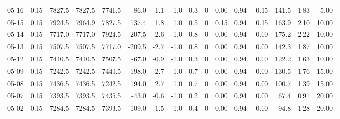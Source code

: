 \begin{threeparttable}
{\begin{tabular}{lrrrrrrrrrrrrrrr}
  05-16 &     0.15 & 7827.5 & 7827.5 & 7741.5 &       86.0 &            1.1 &                      1.0 &                 0.3 &              0 &       0.00 &      0.94 &          -0.15 &            141.5 &            1.83 &                   5.00 \\
  05-15 &     0.15 & 7924.5 & 7964.9 & 7827.5 &      137.4 &            1.8 &                      1.0 &                 0.5 &              0 &       0.15 &      0.94 &           0.15 &            163.9 &            2.10 &                  10.00 \\
  05-14 &     0.15 & 7717.0 & 7717.0 & 7924.5 &     -207.5 &           -2.6 &                     -1.0 &                 0.8 &              0 &       0.00 &      0.94 &           0.00 &            175.2 &            2.22 &                  10.00 \\
  05-13 &     0.15 & 7507.5 & 7507.5 & 7717.0 &     -209.5 &           -2.7 &                     -1.0 &                 0.8 &              0 &       0.00 &      0.94 &           0.00 &            142.3 &            1.87 &                  10.00 \\
  05-12 &     0.15 & 7440.5 & 7440.5 & 7507.5 &      -67.0 &           -0.9 &                     -1.0 &                 0.3 &              0 &       0.00 &      0.94 &           0.00 &            122.2 &            1.63 &                  10.00 \\
  05-09 &     0.15 & 7242.5 & 7242.5 & 7440.5 &     -198.0 &           -2.7 &                     -1.0 &                 0.7 &              0 &       0.00 &      0.94 &           0.00 &            130.5 &            1.76 &                  15.00 \\
  05-08 &     0.15 & 7436.5 & 7436.5 & 7242.5 &      194.0 &            2.7 &                      1.0 &                 0.7 &              0 &       0.00 &      0.94 &           0.00 &            100.7 &            1.39 &                  15.00 \\
  05-07 &     0.15 & 7393.5 & 7393.5 & 7436.5 &      -43.0 &           -0.6 &                     -1.0 &                 0.2 &              0 &       0.00 &      0.94 &           0.00 &             67.4 &            0.91 &                  20.00 \\
  05-02 &     0.15 & 7284.5 & 7284.5 & 7393.5 &     -109.0 &           -1.5 &                     -1.0 &                 0.4 &              0 &       0.00 &      0.94 &           0.00 &             94.8 &            1.28 &                  20.00 \\

\end{tabular}}
\end{threeparttable}
